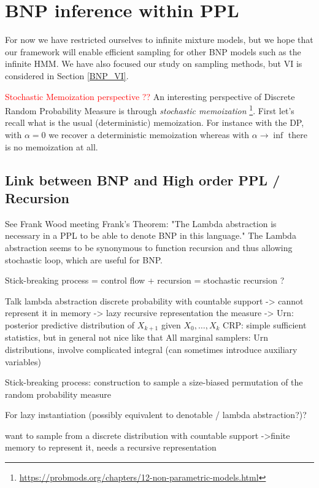 
\chapter{BNP inference within PPL} \label{BNP_PPL}
For now we have restricted ourselves to infinite mixture models, but we hope that our framework will enable efficient sampling for other \gls{BNP} models such as the infinite \acrlong{HMM}. We have also focused our study on sampling methods, but \acrlong{VI} is considered in Section \ref{BNP_VI}.

\textcolor{red}{Stochastic Memoization perspective ??}
An interesting perspective of Discrete Random Probability Measure is through \textit{stochastic memoization} \footnote{\url{https://probmods.org/chapters/12-non-parametric-models.html}}.
First let's recall what is the usual (deterministic) memoization.
For instance with the \gls{DP}, with $\alpha = 0$ we recover a deterministic memoization whereas with $\alpha \rightarrow \inf$ there is no memoization at all.


\section{Link between BNP and High order PPL / Recursion}

See Frank Wood meeting
Frank's Theorem: "The Lambda abstraction is necessary in a PPL to be able to denote BNP in this language." The Lambda abstraction seems to be synonymous to function recursion and thus allowing stochastic loop, which are useful for BNP.

Stick-breaking process = control flow + recursion = stochastic recursion ?

Talk lambda abstraction
discrete probability with countable support -> cannot represent it in memory
-> lazy recursive representation the measure
-> Urn: posterior predictive distribution of $X_{k+1}$ given $X_0, \dots, X_{k}$
CRP: simple sufficient statistics, but in general not nice like that
All marginal samplers: Urn distributions, involve complicated integral (can sometimes introduce auxiliary variables)

Stick-breaking process: construction to sample a size-biased permutation of the random probability measure

For lazy instantiation (possibly equivalent to denotable / lambda abstraction?)?

want to sample from a discrete distribution with countable support
->finite memory
to represent it, needs a recursive representation

